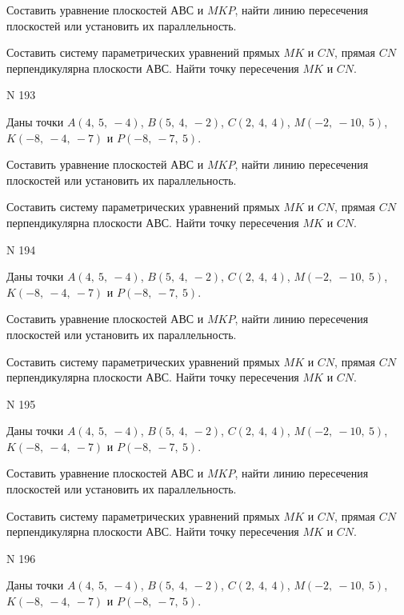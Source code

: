 \documentclass[11pt]{report}
\begin{document}
Составить уравнение плоскостей $АВС$ и $MKP$,
найти линию пересечения плоскостей или установить их параллельность.

Составить систему параметрических уравнений прямых $MK$ и $CN$,
прямая $CN$ перпендикулярна плоскости $АВС$. 
Найти точку пересечения $MK$ и $CN$.



 N 193

Даны точки $A\left( 4, \  5, \  -4\right)$, $B\left( 5, \  4, \  -2\right)$, $C\left( 2, \  4, \  4\right)$, $M\left( -2, \  -10, \  5\right)$, $K\left( -8, \  -4, \  -7\right)$ и $P\left( -8, \  -7, \  5\right)$.


Составить уравнение плоскостей $АВС$ и $MKP$,
найти линию пересечения плоскостей или установить их параллельность.

Составить систему параметрических уравнений прямых $MK$ и $CN$,
прямая $CN$ перпендикулярна плоскости $АВС$. 
Найти точку пересечения $MK$ и $CN$.



 N 194

Даны точки $A\left( 4, \  5, \  -4\right)$, $B\left( 5, \  4, \  -2\right)$, $C\left( 2, \  4, \  4\right)$, $M\left( -2, \  -10, \  5\right)$, $K\left( -8, \  -4, \  -7\right)$ и $P\left( -8, \  -7, \  5\right)$.


Составить уравнение плоскостей $АВС$ и $MKP$,
найти линию пересечения плоскостей или установить их параллельность.

Составить систему параметрических уравнений прямых $MK$ и $CN$,
прямая $CN$ перпендикулярна плоскости $АВС$. 
Найти точку пересечения $MK$ и $CN$.



 N 195

Даны точки $A\left( 4, \  5, \  -4\right)$, $B\left( 5, \  4, \  -2\right)$, $C\left( 2, \  4, \  4\right)$, $M\left( -2, \  -10, \  5\right)$, $K\left( -8, \  -4, \  -7\right)$ и $P\left( -8, \  -7, \  5\right)$.


Составить уравнение плоскостей $АВС$ и $MKP$,
найти линию пересечения плоскостей или установить их параллельность.

Составить систему параметрических уравнений прямых $MK$ и $CN$,
прямая $CN$ перпендикулярна плоскости $АВС$. 
Найти точку пересечения $MK$ и $CN$.



 N 196

Даны точки $A\left( 4, \  5, \  -4\right)$, $B\left( 5, \  4, \  -2\right)$, $C\left( 2, \  4, \  4\right)$, $M\left( -2, \  -10, \  5\right)$, $K\left( -8, \  -4, \  -7\right)$ и $P\left( -8, \  -7, \  5\right)$.
\end{document}
